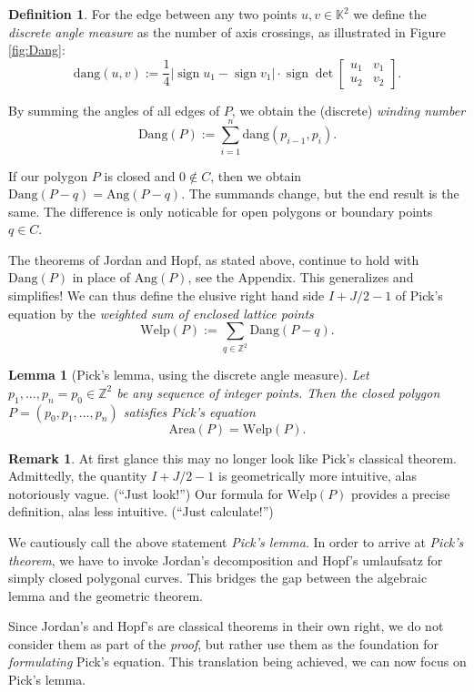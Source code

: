 \documentclass[a4paper]{amsart}
\numberwithin{equation}{section}
\theoremstyle{plain}
\newtheorem{lemma}[theorem]{Lemma}
\theoremstyle{definition}
\newtheorem{definition}[theorem]{Definition}
\newtheorem{remark}[theorem]{Remark}
\newcommand{\Z}{\mathbb{Z}}
\newcommand{\R}{\mathbb{R}}
\newcommand{\K}{\mathbb{K}}
\newcommand{\minus}{\smallsetminus}
\newcommand{\bigabs}[1]{\bigl\lvert #1 \bigr\rvert{}}
\DeclareMathOperator{\sign}{sign}
\newcommand{\Area}{\mathrm{Area}}
\newcommand{\Ang}{\mathrm{Ang}}
\newcommand{\dang}{\mathrm{dang}}
\newcommand{\Dang}{\mathrm{Dang}}
\newcommand{\Welp}{\mathrm{Welp}}
\begin{document}
\begin{definition}
  For the edge between any two points $u,v \in \K^2$
  we define the \emph{discrete angle measure}
  as the number of axis crossings,
  as illustrated in Figure \ref{fig:Dang}:
  \[
    \dang(u,v) :=
    \frac{1}{4} \bigabs{ \sign u_1 - \sign v_1 }
    \cdot \sign \det \begin{bmatrix} u_1 & v_1 \\ u_2 & v_2 \end{bmatrix} .
  \]

  By summing the angles of all edges of $P$,
  we obtain the (discrete) \emph{winding number} %
  \[
  \Dang(P) := \sum_{i=1}^n \dang(p_{i-1},p_i) .
  \]
\end{definition}

If our polygon $P$ is closed and $0 \notin C$,
then we obtain $\Dang(P-q) = \Ang(P-q)$.
The summands change, but the end result is the same.
The difference is only noticable for open polygons
or boundary points $q \in C$.


The theorems of Jordan and Hopf, as stated above, continue
to hold with $\Dang(P)$ in place of $\Ang(P)$, see the Appendix.
This generalizes and simplifies! %
We can thus define the elusive right hand side $I + J/2 - 1$ of Pick's equation
by the \emph{weighted sum of enclosed lattice points}
\[
\Welp(P) := \sum_{q \in \Z^2} \Dang(P-q) .
\]

\begin{lemma}[Pick's lemma, using the discrete angle measure] \label{lem:PickDiscrete}
  Let $p_1,\ldots,p_n=p_0 \in \Z^2$ be any sequence of integer points.
  Then the closed polygon $P = (p_0,p_1,\ldots,p_n)$ satisfies Pick's equation 
  \[
  \Area(P) = \Welp(P) .
  \]
\end{lemma}

\begin{remark}
  At first glance this may no longer look like Pick's classical theorem.
  Admittedly, the quantity $I + J/2 - 1$ is geometrically more intuitive,
  alas notoriously vague. (``Just look!'') %
  Our formula for $\Welp(P)$ provides a precise definition,
  alas less intuitive. (``Just calculate!'')
  
  We cautiously call the above statement \emph{Pick's lemma}.
  In order to arrive at \emph{Pick's theorem},
  we have to invoke Jordan's decomposition and Hopf's umlaufsatz
  for simply closed polygonal curves.
  This bridges the gap between the algebraic lemma
  and the geometric theorem.

  Since Jordan's and Hopf's are classical theorems in their own right,
  we do not consider them as part of the \emph{proof},
  but rather use them as the foundation
  for \emph{formulating} Pick's equation. %
  This translation being achieved, we can now focus on Pick's lemma.
\end{remark}
\end{document}
